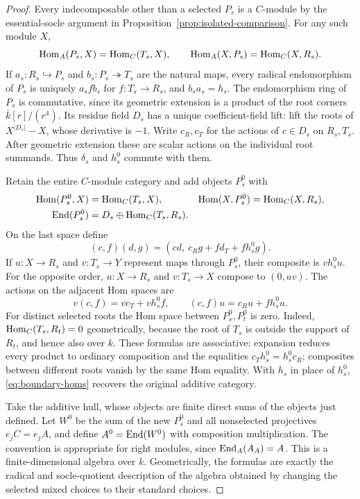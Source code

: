 \begin{proof}
Every indecomposable other than a selected $P_s$ is a $C$-module by the essential-socle argument in Proposition~\ref{prop:isolated-comparison}. For any such module $X$,
\begin{equation}\label{eq:boundary-homs}
 \operatorname{Hom}_A(P_s,X)=\operatorname{Hom}_C(T_s,X),\qquad
 \operatorname{Hom}_A(X,P_s)=\operatorname{Hom}_C(X,R_s).
\end{equation}
If $a_s:R_s\hookrightarrow P_s$ and $b_s:P_s\twoheadrightarrow T_s$ are the natural maps, every radical endomorphism of $P_s$ is uniquely $a_sfb_s$ for $f:T_s\to R_s$, and $b_sa_s=h_s$. The endomorphism ring of $P_s$ is commutative, since its geometric extension is a product of the root corners $\bar k[r]/(r^4)$. Its residue field $D_s$ has a unique coefficient-field lift: lift the roots of $X^{|D_s|}-X$, whose derivative is $-1$. Write $c_R,c_T$ for the actions of $c\in D_s$ on $R_s,T_s$. After geometric extension these are scalar actions on the individual root summands. Thus $\delta_s$ and $h_s^0$ commute with them.

Retain the entire $C$-module category and add objects $P_s^0$ with
\begin{align*}
 \operatorname{Hom}(P_s^0,X)&=\operatorname{Hom}_C(T_s,X),&
 \operatorname{Hom}(X,P_s^0)&=\operatorname{Hom}_C(X,R_s),\\
 \operatorname{End}(P_s^0)&=D_s\oplus\operatorname{Hom}_C(T_s,R_s).
\end{align*}
On the last space define
\begin{equation}\label{eq:new-corner}
 (c,f)(d,g)=(cd,\ c_Rg+fd_T+fh_s^0g).
\end{equation}
If $u:X\to R_s$ and $v:T_s\to Y$ represent maps through $P_s^0$, their composite is $vh_s^0u$. For the opposite order, $u:X\to R_s$ and $v:T_s\to X$ compose to $(0,uv)$. The actions on the adjacent Hom spaces are
\[
 v(c,f)=vc_T+vh_s^0f,\qquad (c,f)u=c_Ru+fh_s^0u.
\]
For distinct selected roots the Hom space between $P_s^0,P_t^0$ is zero. Indeed, $\operatorname{Hom}_C(T_s,R_t)=0$ geometrically, because the root of $T_s$ is outside the support of $R_t$, and hence also over $k$. These formulas are associative: expansion reduces every product to ordinary composition and the equalities $c_Th_s^0=h_s^0c_R$; composites between different roots vanish by the same Hom equality. With $h_s$ in place of $h_s^0$, \eqref{eq:boundary-homs} recovers the original additive category.

Take the additive hull, whose objects are finite direct sums of the objects just defined. Let $W^0$ be the sum of the new $P_s^0$ and all nonselected projectives $e_jC=e_jA$, and define $A^0=\operatorname{End}(W^0)$ with composition multiplication. The convention is appropriate for right modules, since $\operatorname{End}_A(A_A)=A$. This is a finite-dimensional algebra over $k$. Geometrically, the formulas are exactly the radical and socle-quotient description of the algebra obtained by changing the selected mixed choices to their standard choices.


\end{proof}
